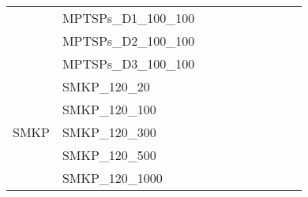 \begin{table}[]
{\begin{tabular}{|c|l|ll|ll|ll|l|l|}
			& MPTSPs\_D1\_100\_100          &                                   &                                  &                           &                          &                           &                          &                                       &                                \\
			& MPTSPs\_D2\_100\_100          &                                   &                                  &                           &                          &                           &                          &                                       &                                \\
			& MPTSPs\_D3\_100\_100          &                                   &                                  &                           &                          &                           &                          &                                       &                                \\ \hline
			\multirow{5}{*}{SMKP}   & SMKP\_120\_20                 &                                   &                                  &                           &                          &                           &                          &                                       &                                \\
			& SMKP\_120\_100                &                                   &                                  &                           &                          &                           &                          &                                       &                                \\
			& SMKP\_120\_300                &                                   &                                  &                           &                          &                           &                          &                                       &                                \\
			& SMKP\_120\_500                &                                   &                                  &                           &                          &                           &                          &                                       &                                \\
			& SMKP\_120\_1000               &                                   &                                  &                           &                          &                           &                          &                                       &                                \\ \hline

\end{tabular}}
\end{table}
